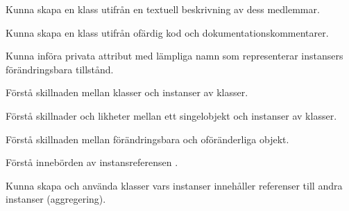 

\item Kunna skapa en klass utifrån en textuell beskrivning av dess medlemmar.
\item Kunna skapa en klass utifrån ofärdig kod och dokumentationskommentarer.
\item Kunna införa privata attribut med lämpliga namn som representerar instansers förändringsbara tillstånd.
\item Förstå skillnaden mellan klasser och instanser av klasser.
\item Förstå skillnader och likheter mellan ett singelobjekt och instanser av klasser.
\item Förstå skillnaden mellan förändringsbara och oföränderliga objekt.
\item Förstå innebörden av instansreferensen .
\item Kunna skapa och använda klasser vars instanser innehåller referenser till andra instanser (aggregering).